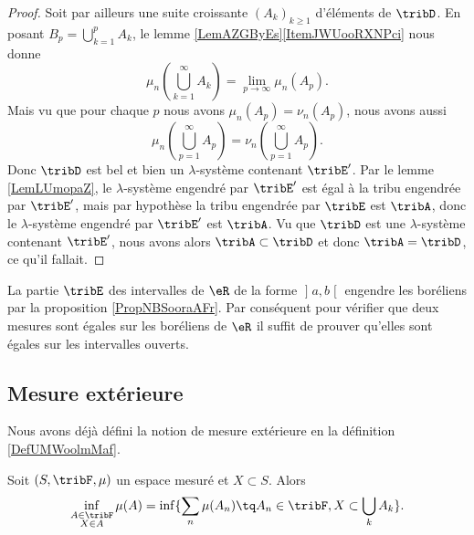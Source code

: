 \begin{proof}
    Soit par ailleurs une suite croissante \( (A_k)_{k\geq 1}\) d'éléments de \( \tribD\). En posant \( B_p=\bigcup_{k=1}^pA_k\), le lemme \ref{LemAZGByEs}\ref{ItemJWUooRXNPci} nous donne
    \begin{equation}
        \mu_n(\bigcup_{k=1}^{\infty}A_k)=\lim_{p\to \infty} \mu_n(A_p).
    \end{equation}
    Mais vu que pour chaque \( p\) nous avons \( \mu_n(A_p)=\nu_n(A_p)\), nous avons aussi
    \begin{equation}
        \mu_n(\bigcup_{p=1}^{\infty}A_p)=\nu_n(\bigcup_{p=1}^{\infty}A_p).
    \end{equation}
    Donc \( \tribD\) est bel et bien un \( \lambda\)-système contenant \( \tribE'\). Par le lemme \ref{LemLUmopaZ}, le \( \lambda\)-système engendré par \( \tribE'\) est égal à la tribu engendrée par \( \tribE'\), mais par hypothèse la tribu engendrée par \( \tribE\) est \( \tribA\), donc le \( \lambda\)-système engendré par \( \tribE'\) est \( \tribA\). Vu que \( \tribD\) est une \( \lambda\)-système contenant \( \tribE'\), nous avons alors \( \tribA\subset\tribD\) et donc \( \tribA=\tribD\), ce qu'il fallait.
\end{proof}

\begin{example}\label{ExDMPoohtNAj}
    La partie \( \tribE\) des intervalles de \( \eR\) de la forme \( \mathopen] a , b \mathclose[\) engendre les boréliens par la proposition \ref{PropNBSooraAFr}. Par conséquent pour vérifier que deux mesures sont égales sur les boréliens de \( \eR\) il suffit de prouver qu'elles sont égales sur les intervalles ouverts.
\end{example}

\subsection{Mesure extérieure}

Nous avons déjà défini la notion de mesure extérieure en la définition \ref{DefUMWoolmMaf}.

\begin{lemma}  \label{LemULSooBgZLI}
    Soit \( (S,\tribF,\mu)\) un espace mesuré et \( X\subset S\). Alors
    \begin{equation}
        \inf_{\substack{A\in\tribF\\X\in A}}\mu(A)=\inf\{ \sum_n\mu(A_n)\tq A_n\in\tribF,X\subset\bigcup_kA_k \}.
    \end{equation}
\end{lemma}

